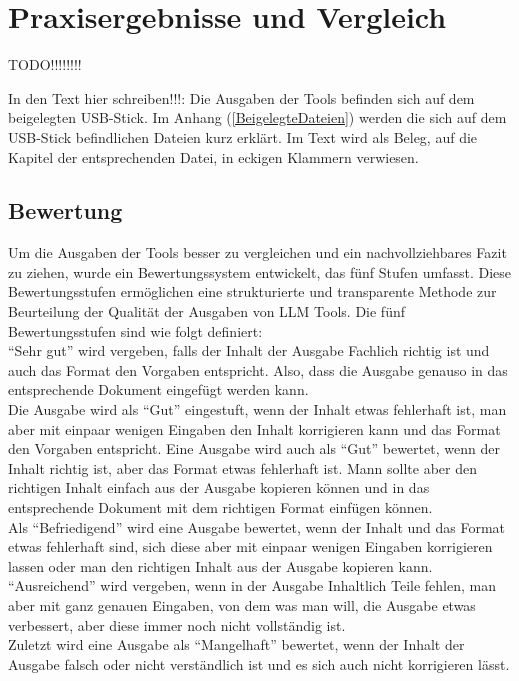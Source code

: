 
\chapter{Praxisergebnisse und Vergleich} 

TODO!!!!!!!!

In den Text hier schreiben!!!: Die Ausgaben der Tools befinden sich auf dem beigelegten USB-Stick. Im Anhang 
(\autoref{BeigelegteDateien}) werden die sich auf dem USB-Stick befindlichen Dateien kurz erklärt. Im Text 
wird als Beleg, auf die Kapitel der entsprechenden Datei, in eckigen Klammern verwiesen. 

\section{Bewertung}  \label{BewertungLLMTools}

Um die Ausgaben der Tools besser zu vergleichen und ein nachvollziehbares Fazit zu ziehen, wurde ein Bewertungssystem 
entwickelt, das fünf Stufen umfasst. Diese Bewertungsstufen ermöglichen eine strukturierte und transparente Methode 
zur Beurteilung der Qualität der Ausgaben von LLM Tools. Die fünf Bewertungsstufen sind wie folgt definiert:\\

``Sehr gut'' wird vergeben, falls der Inhalt der Ausgabe Fachlich richtig ist und auch das Format den Vorgaben entspricht.
Also, dass die Ausgabe genauso in das entsprechende Dokument eingefügt werden kann.\\
Die Ausgabe wird als ``Gut'' eingestuft, wenn der Inhalt etwas fehlerhaft ist, man aber mit einpaar wenigen Eingaben 
den Inhalt korrigieren kann und das Format den Vorgaben entspricht. Eine Ausgabe wird auch als ``Gut'' bewertet, wenn 
der Inhalt richtig ist, aber das Format etwas fehlerhaft ist. Mann sollte aber den richtigen Inhalt einfach aus der 
Ausgabe kopieren können und in das entsprechende Dokument mit dem richtigen Format einfügen können.\\
Als ``Befriedigend'' wird eine Ausgabe bewertet, wenn der Inhalt und das Format etwas fehlerhaft sind, sich diese aber 
mit einpaar wenigen Eingaben korrigieren lassen oder man den richtigen Inhalt aus der Ausgabe kopieren kann.\\
``Ausreichend'' wird vergeben, wenn in der Ausgabe Inhaltlich Teile fehlen, man aber mit ganz genauen Eingaben, von dem 
was man will, die Ausgabe etwas verbessert, aber diese immer noch nicht vollständig ist.\\
Zuletzt wird eine Ausgabe als ``Mangelhaft'' bewertet, wenn der Inhalt der Ausgabe falsch oder nicht verständlich ist
und es sich auch nicht korrigieren lässt.\\

